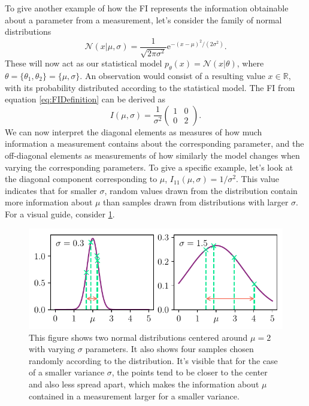 To give another example of how the FI represents the information obtainable about a parameter from a measurement, let's consider the family of normal distributions
\begin{equation}
	\mathcal{N}(x|\mu,\sigma) = \frac{1}{\sqrt{2\pi\sigma^2}}\mathrm{e}^{-(x-\mu)^2/(2\sigma^2)}.
\end{equation} 
These will now act as our statistical model $p_\theta(x) = \mathcal{N}(x|\theta)$, where $\theta = \{\theta_1,\theta_2\} = \{\mu, \sigma\}$. An observation would consist of a resulting value $x\in \mathbb{R}$, with its probability distributed according to the statistical model. The FI from equation \cref{eq:FIDefinition} can be derived as 
\begin{equation}
	I(\mu,\sigma) = \frac{1}{\sigma^2}
	\begin{pmatrix}
		1 & 0 \\
		0 & 2
	\end{pmatrix}.
\end{equation}
We can now interpret the diagonal elements as measures of how much information a measurement contains about the corresponding parameter, and the off-diagonal elements as measurements of how similarly the model changes when varying the corresponding parameters. To give a specific example, let's look at the diagonal component corresponding to $\mu$, $I_{11}(\mu,\sigma) = 1/\sigma^2$. This value indicates that for smaller $\sigma$, random values drawn from the distribution contain more information about $\mu$ than samples drawn from distributions with larger $\sigma$. For a visual guide, consider \cref{fig:NormalDistributionExample}.
\begin{figure}
	\centering
	\includegraphics{"text/FisherInformation/plots/NormalDistributionPlot.pdf"}
	\caption{This figure shows two normal distributions centered around $\mu = 2$ with varying $\sigma$ parameters. It also shows four samples chosen randomly according to the distribution. It's visible that for the case of a smaller variance $\sigma$, the points tend to be closer to the center and also less spread apart, which makes the information about $\mu$ contained in a measurement larger for a smaller variance.}
	\label{fig:NormalDistributionExample}
\end{figure}

